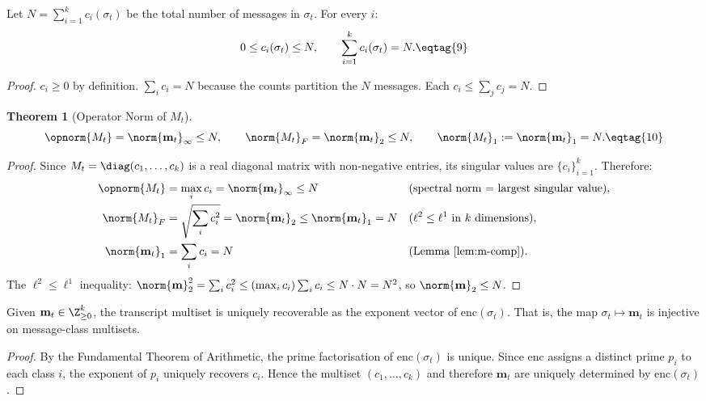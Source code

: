 \documentclass[11pt,letterpaper]{article}
\newtheorem{theorem}{Theorem}[section]
\begin{document}
\begin{lemma}\label{lem:m-comp}
Let $N = \sum_{i=1}^k c_i(\sigma_t)$ be the total number of messages in
$\sigma_t$. For every $i$:
\[
  0 \leq c_i(\sigma_t) \leq N, \qquad
  \sum_{i=1}^k c_i(\sigma_t) = N. \eqtag{9}
\]
\end{lemma}

\begin{proof}
$c_i \geq 0$ by definition. $\sum_i c_i = N$ because the counts partition the
$N$ messages. Each $c_i \leq \sum_j c_j = N$.
\end{proof}

\begin{theorem}[Operator Norm of $M_t$]\label{thm:M-norm}
\[
  \opnorm{M_t} = \norm{\mathbf{m}_t}_\infty \leq N,
  \qquad
  \norm{M_t}_F = \norm{\mathbf{m}_t}_2 \leq N,
  \qquad
  \norm{M_t}_1 := \norm{\mathbf{m}_t}_1 = N. \eqtag{10}
\]
\end{theorem}

\begin{proof}
Since $M_t = \diag(c_1,\ldots,c_k)$ is a real diagonal matrix with
non-negative entries, its singular values are $\{c_i\}_{i=1}^k$.
Therefore:
\begin{align*}
  \opnorm{M_t} &= \max_i c_i = \norm{\mathbf{m}_t}_\infty \leq N
    && \text{(spectral norm = largest singular value)},\\
  \norm{M_t}_F &= \sqrt{\sum_i c_i^2} = \norm{\mathbf{m}_t}_2 \leq \norm{\mathbf{m}_t}_1 = N
    && \text{($\ell^2 \leq \ell^1$ in $k$ dimensions)},\\
  \norm{\mathbf{m}_t}_1 &= \sum_i c_i = N
    && \text{(Lemma~\ref{lem:m-comp})}.
\end{align*}
The $\ell^2 \leq \ell^1$ inequality: $\norm{\mathbf{m}}_2^2 = \sum_i c_i^2
\leq (\max_i c_i)\sum_i c_i \leq N \cdot N = N^2$, so $\norm{\mathbf{m}}_2 \leq N$.
\end{proof}

\begin{corollary}\label{cor:unique-enc}
Given $\mathbf{m}_t \in \Z_{\geq 0}^k$, the transcript multiset is uniquely
recoverable as the exponent vector of $\mathrm{enc}(\sigma_t)$. That is,
the map $\sigma_t \mapsto \mathbf{m}_t$ is injective on message-class multisets.
\end{corollary}

\begin{proof}
By the Fundamental Theorem of Arithmetic, the prime factorisation of
$\mathrm{enc}(\sigma_t)$ is unique. Since $\mathrm{enc}$ assigns a distinct
prime $p_i$ to each class $i$, the exponent of $p_i$ uniquely recovers $c_i$.
Hence the multiset $(c_1,\ldots,c_k)$ and therefore $\mathbf{m}_t$ are uniquely
determined by $\mathrm{enc}(\sigma_t)$.
\end{proof}
\end{document}
